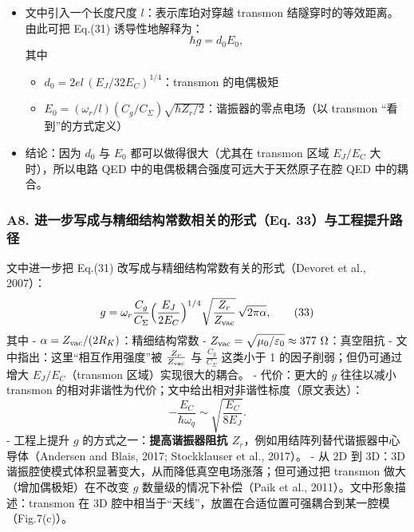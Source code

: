 \documentclass[12pt,a4paper,oneside]{ctexbook}
\providecommand{\tightlist}{%
  \setlength{\itemsep}{0pt}\setlength{\parskip}{0pt}}
\begin{document}
\begin{itemize}
\tightlist
\item
  文中引入一个长度尺度 \(l\)：表示库珀对穿越 transmon
  结隧穿时的等效距离。由此可把 Eq.(31) 诱导性地解释为： \[
  \hbar g = d_0 E_0,
  \] 其中

  \begin{itemize}
  \tightlist
  \item
    \(d_0=2el\,(E_J/32E_C)^{1/4}\)：transmon 的电偶极矩\\
  \item
    \(E_0=(\omega_r/l)(C_g/C_\Sigma)\sqrt{\hbar Z_r/2}\)：谐振器的零点电场（以
    transmon ``看到''的方式定义）
  \end{itemize}
\item
  结论：因为 \(d_0\) 与 \(E_0\) 都可以做得很大（尤其在 transmon 区域
  \(E_J/E_C\) 大时），所以电路 QED
  中的电偶极耦合强度可远大于天然原子在腔 QED 中的耦合。
\end{itemize}

\subsubsection{\texorpdfstring{\textbf{A8.
进一步写成与精细结构常数相关的形式（Eq.
33）与工程提升路径}}{A8. 进一步写成与精细结构常数相关的形式（Eq. 33）与工程提升路径}}\label{a8.-ux8fdbux4e00ux6b65ux5199ux6210ux4e0eux7cbeux7ec6ux7ed3ux6784ux5e38ux6570ux76f8ux5173ux7684ux5f62ux5f0feq.-33ux4e0eux5de5ux7a0bux63d0ux5347ux8defux5f84}

文中进一步把 Eq.(31) 改写成与精细结构常数有关的形式（Devoret et al.,
2007）： \[
g=\omega_r\frac{C_g}{C_\Sigma}\Big(\frac{E_J}{2E_C}\Big)^{1/4}
\sqrt{\frac{Z_r}{Z_{\rm vac}}}\,\sqrt{2\pi\alpha},
\tag{33}
\] 其中 - \(\alpha=Z_{\rm vac}/(2R_K)\)：精细结构常数 -
\(Z_{\rm vac}=\sqrt{\mu_0/\varepsilon_0}\approx 377~\Omega\)：真空阻抗 -
文中指出：这里``相互作用强度''被 \(\frac{Z_r}{Z_{\rm vac}}\) 与
\(\frac{C_g}{C_\Sigma}\) 这类小于 1 的因子削弱；但仍可通过增大
\(E_J/E_C\)（transmon 区域）实现很大的耦合。 - 代价：更大的 \(g\)
往往以减小 transmon
的相对非谐性为代价；文中给出相对非谐性标度（原文表达）： \[
  -\frac{E_C}{\hbar\omega_q}\sim \sqrt{\frac{E_C}{8E_J}}.
  \] - 工程上提升 \(g\) 的方式之一：\textbf{提高谐振器阻抗
\(Z_r\)}，例如用结阵列替代谐振器中心导体（Andersen and Blais, 2017;
Stockklauser et al., 2017）。 - 从 2D 到 3D：3D
谐振腔使模式体积显著变大，从而降低真空电场涨落；但可通过把 transmon
做大（增加偶极矩）在不改变 \(g\) 数量级的情况下补偿（Paik et al.,
2011）。文中形象描述：transmon 在 3D
腔中相当于``天线''，放置在合适位置可强耦合到某一腔模（Fig.7(c)）。
\end{document}
